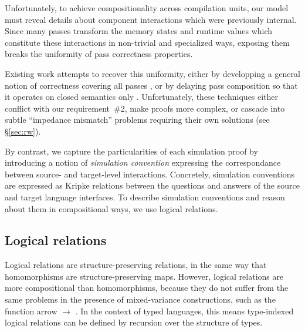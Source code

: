 \documentclass[acmsmall,authordraft]{acmart}
\begin{document}
Unfortunately,
to achieve compositionality across compilation units,
our model must reveal details
about component interactions
which were previously internal.
Since many passes transform the
memory states and runtime values
which constitute these interactions
in non-trivial and specialized ways,
exposing them breaks the uniformity
of pass correctness properties.

Existing work attempts to recover this uniformity,
either by developping a general notion of correctness
covering all passes
\cite{compcompcert,compcertm},
or by delaying pass composition so that
it operates on closed semantics only
\cite{sepcompcert,compcertm}.
Unfortunately, these techniques either
conflict with our requirement~\#2,
make proofs more complex,
or cascade into subtle ``impedance mismatch'' problems
requiring their own solutions (see \S\ref{sec:rw}).

By contrast,
we capture the particularities of each simulation proof
by introducing a notion of \emph{simulation convention}
expressing the correspondance between
source- and target-level interactions.
Concretely,
simulation conventions are expressed as Kripke relations
between the questions and answers of
the source and target language interfaces.
To describe simulation conventions
and reason about them
in compositional ways,
we use logical relations.



\subsection{Logical relations} \label{sec:logrel} %

Logical relations are structure-preserving relations,
in the same way that homomorphisms are structure-preserving maps.
However,
logical relations are more compositional than homomorphisms,
because they do not suffer from the same problems
in the presence of mixed-variance constructions,
such as the function arrow $\rightarrow$ \cite{lrp}.
In the context of typed languages,
this means type-indexed logical relations
can be defined by recursion over the structure of types.

\end{document}
